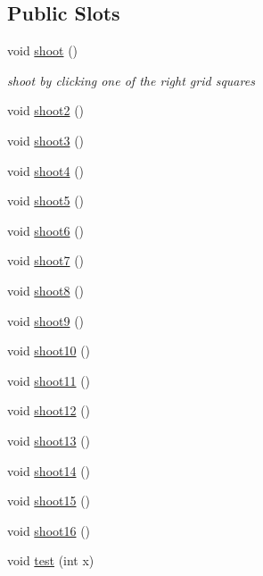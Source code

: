 \subsection*{Public Slots}
\begin{DoxyCompactItemize}
\item 
void \hyperlink{classbattleshipgame_aa5a079217b1de092692515bc8fda0443}{shoot} ()
\begin{DoxyCompactList}\small\item\em shoot by clicking one of the right grid squares \end{DoxyCompactList}\item 
void \hyperlink{classbattleshipgame_ab43d1b9348297ee4260ee31963efd49c}{shoot2} ()
\item 
void \hyperlink{classbattleshipgame_afce5fc9dedff42dd1fb8e43bd6dde974}{shoot3} ()
\item 
void \hyperlink{classbattleshipgame_aa660fbca945531186f483aed25c3f5d7}{shoot4} ()
\item 
void \hyperlink{classbattleshipgame_a31f1aecdbcbff314bb1c36fd0af2691a}{shoot5} ()
\item 
void \hyperlink{classbattleshipgame_a1af239789255b2d3c6b33789ccffae35}{shoot6} ()
\item 
void \hyperlink{classbattleshipgame_a56ca4e048cb8e5d66719ceca1b556d76}{shoot7} ()
\item 
void \hyperlink{classbattleshipgame_a54920293bf8c78680cab53c79958e609}{shoot8} ()
\item 
void \hyperlink{classbattleshipgame_adf78a189286f1bce1f6c291b4b7c72b4}{shoot9} ()
\item 
void \hyperlink{classbattleshipgame_a573cf39fd3700ffd3a79587437d66d37}{shoot10} ()
\item 
void \hyperlink{classbattleshipgame_abe53aab52ef793e5ca534fa53768ca49}{shoot11} ()
\item 
void \hyperlink{classbattleshipgame_a297eea8922b7e2b678d31396da8ba96e}{shoot12} ()
\item 
void \hyperlink{classbattleshipgame_a51fcb1716e0ad6cebc777c14a76c9f50}{shoot13} ()
\item 
void \hyperlink{classbattleshipgame_a2e1f24999099b5c301253a244d46c663}{shoot14} ()
\item 
void \hyperlink{classbattleshipgame_a3b024b5ad7c747303c00b740f0921751}{shoot15} ()
\item 
void \hyperlink{classbattleshipgame_a1dddc9c9d3ced3792fc33ec510976e8f}{shoot16} ()
\item 
void \hyperlink{classbattleshipgame_a2bc96daab5fee23ae0a5718416d52bec}{test} (int x)

\end{DoxyCompactItemize}
